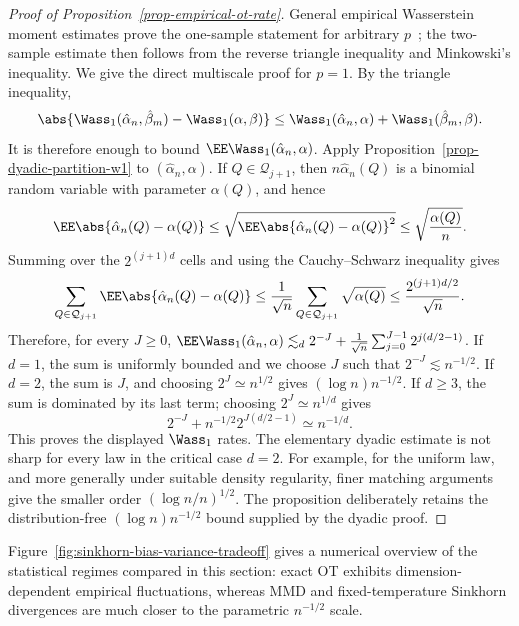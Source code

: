 \begin{proof}[Proof of Proposition~\ref{prop-empirical-ot-rate}]
	General empirical Wasserstein moment estimates prove the one-sample statement for arbitrary \(p\)~\cite{dereich2013constructive,fournier2015rate}; the two-sample estimate then follows from the reverse triangle inequality and Minkowski's inequality. We give the direct multiscale proof for \(p=1\).
	By the triangle inequality,
	\[
		\abs{\Wass_1(\hat\alpha_n,\hat\beta_m)-\Wass_1(\alpha,\beta)}
		\leq
		\Wass_1(\hat\alpha_n,\alpha)+\Wass_1(\hat\beta_m,\beta).
	\]
	It is therefore enough to bound \(\EE\Wass_1(\hat\alpha_n,\alpha)\). Apply Proposition~\ref{prop-dyadic-partition-w1} to \((\hat\alpha_n,\alpha)\). If \(Q\in\mathcal Q_{j+1}\), then \(n\hat\alpha_n(Q)\) is a binomial random variable with parameter \(\alpha(Q)\), and hence
	\[
		\EE\abs{\hat\alpha_n(Q)-\alpha(Q)}
		\leq
		\sqrt{\EE\abs{\hat\alpha_n(Q)-\alpha(Q)}^2}
		\leq
		\sqrt{\frac{\alpha(Q)}{n}}.
	\]
	Summing over the \(2^{(j+1)d}\) cells and using the Cauchy--Schwarz inequality gives
	\[
		\sum_{Q\in\mathcal Q_{j+1}}
		\EE\abs{\hat\alpha_n(Q)-\alpha(Q)}
		\leq
		\frac{1}{\sqrt n}
		\sum_{Q\in\mathcal Q_{j+1}}\sqrt{\alpha(Q)}
		\leq
		\frac{2^{(j+1)d/2}}{\sqrt n}.
	\]
	Therefore, for every \(J\geq0\),
	$\EE\Wass_1(\hat\alpha_n,\alpha) \lesssim_d 2^{-J} + \frac1{\sqrt n} \sum_{j=0}^{J-1}2^{j(d/2-1)}$.
	If \(d=1\), the sum is uniformly bounded and we choose \(J\) such that \(2^{-J}\lesssim n^{-1/2}\). If \(d=2\), the sum is \(J\), and choosing \(2^J\simeq n^{1/2}\) gives \((\log n)n^{-1/2}\). If \(d\geq3\), the sum is dominated by its last term; choosing \(2^J\simeq n^{1/d}\) gives
	\[
		2^{-J}
		+
		n^{-1/2}2^{J(d/2-1)}
		\simeq
		n^{-1/d}.
	\]
	This proves the displayed \(\Wass_1\) rates. The elementary dyadic estimate is not sharp for every law in the critical case \(d=2\). For example, for the uniform law, and more generally under suitable density regularity, finer matching arguments give the smaller order \((\log n/n)^{1/2}\). The proposition deliberately retains the distribution-free \((\log n)n^{-1/2}\) bound supplied by the dyadic proof.
\end{proof}

Figure~\ref{fig:sinkhorn-bias-variance-tradeoff} gives a numerical overview of the statistical regimes compared in this section: exact OT exhibits dimension-dependent empirical fluctuations, whereas MMD and fixed-temperature Sinkhorn divergences are much closer to the parametric $n^{-1/2}$ scale.

